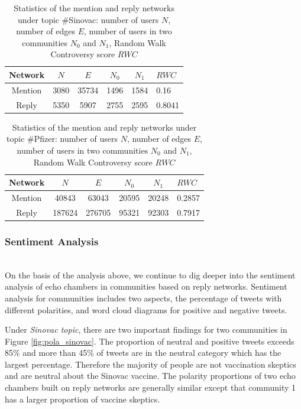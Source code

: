 \documentclass[sigplan,screen]{acmart}
\begin{document}
\begin{table}
  \caption{Statistics of the mention and reply networks under topic \#Sinovac: number of users $N$, number of edges $E$, number of users in two communities $N_0$ and $N_1$, Random Walk Controversy score $RWC$}
  \label{tab: s_rwc}
  \begin{tabular}{cccccl}
    \toprule
    Network & $N$ & $E$ & $N_0$ & $N_1$ & $RWC$\\
    \midrule
    Mention & 3080 & 35734 & 1496 & 1584 & 0.16\\
    Reply & 5350 & 5907 & 2755 & 2595 & 0.8041\\
  \bottomrule
\end{tabular}
\end{table}

\begin{table}
  \caption{Statistics of the mention and reply networks under topic \#Pfizer: number of users $N$, number of edges $E$, number of users in two communities $N_0$ and $N_1$, Random Walk Controversy score $RWC$}
  \label{tab: p_rwc}
  \begin{tabular}{cccccl}
    \toprule
    Network & $N$ & $E$ & $N_0$ & $N_1$ & $RWC$\\
    \midrule
    Mention & 40843 & 63043 & 20595 & 20248 & 0.2857\\
    Reply & 187624 & 276705 & 95321 & 92303 & 0.7917\\
  \bottomrule
\end{tabular}
\end{table}

\subsubsection{Sentiment Analysis}
~\\
On the basis of the analysis above, we continue to dig deeper into the sentiment analysis of echo chambers in communities based on reply networks. Sentiment analysis for communities includes two aspects, the percentage of tweets with different polarities, and word cloud diagrams for positive and negative tweets.

Under \textit{Sinovac topic}, there are two important findings for two communities in Figure \ref{fig:pola_sinovac}. The proportion of neutral and positive tweets exceeds 85\% and more than 45\% of tweets are in the neutral category which has the largest percentage. Therefore the majority of people are not vaccination skeptics and are neutral about the Sinovac vaccine. The polarity proportions of two echo chambers built on reply networks are generally similar except that community 1 has a larger proportion of vaccine skeptics. 
\end{document}

